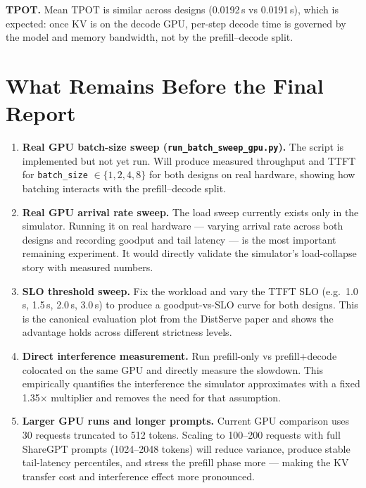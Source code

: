 \documentclass[11pt,letterpaper]{article}
\begin{document}
\textbf{TPOT.} Mean TPOT is similar across designs (0.0192\,s vs 0.0191\,s),
which is expected: once KV is on the decode GPU, per-step decode time is governed
by the model and memory bandwidth, not by the prefill--decode split.

\section{What Remains Before the Final Report}

\begin{enumerate}[noitemsep,topsep=3pt]

  \item \textbf{Real GPU batch-size sweep (\texttt{run\_batch\_sweep\_gpu.py}).}
  The script is implemented but not yet run. Will produce measured throughput and
  TTFT for \texttt{batch\_size} $\in \{1,2,4,8\}$ for both designs on real
  hardware, showing how batching interacts with the prefill--decode split.

  \item \textbf{Real GPU arrival rate sweep.}
  The load sweep currently exists only in the simulator. Running it on real
  hardware --- varying arrival rate across both designs and recording goodput and
  tail latency --- is the most important remaining experiment. It would directly
  validate the simulator's load-collapse story with measured numbers.

  \item \textbf{SLO threshold sweep.}
  Fix the workload and vary the TTFT SLO (e.g.\ 1.0\,s, 1.5\,s, 2.0\,s, 3.0\,s)
  to produce a goodput-vs-SLO curve for both designs. This is the canonical
  evaluation plot from the DistServe paper and shows the advantage holds across
  different strictness levels.

  \item \textbf{Direct interference measurement.}
  Run prefill-only vs prefill+decode colocated on the same GPU and directly
  measure the slowdown. This empirically quantifies the interference the
  simulator approximates with a fixed 1.35$\times$ multiplier and removes the
  need for that assumption.

  \item \textbf{Larger GPU runs and longer prompts.}
  Current GPU comparison uses 30 requests truncated to 512 tokens. Scaling to
  100--200 requests with full ShareGPT prompts (1024--2048 tokens) will reduce
  variance, produce stable tail-latency percentiles, and stress the prefill phase
  more — making the KV transfer cost and interference effect more pronounced.


\end{enumerate}
\end{document}
